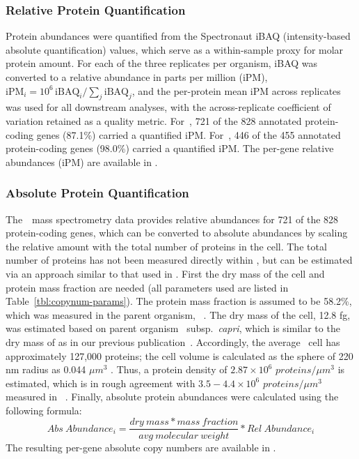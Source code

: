 \subsubsection{Relative Protein Quantification}

Protein abundances were quantified from the Spectronaut iBAQ (intensity-based absolute quantification) values, which serve as a within-sample proxy for molar protein amount.
For each of the three replicates per organism, iBAQ was converted to a relative abundance in parts per million (iPM), $\text{iPM}_i = 10^{6}\,\text{iBAQ}_i / \sum_j \text{iBAQ}_j$, and the per-protein mean iPM across replicates was used for all downstream analyses, with the across-replicate coefficient of variation retained as a quality metric.
For~\syn, 721 of the 828 annotated protein-coding genes (87.1\%) carried a quantified iPM.
For~\syna, 446 of the 455 annotated protein-coding genes (98.0\%) carried a quantified iPM.
The per-gene relative abundances (iPM) are available in \sdomics.

\subsubsection{Absolute Protein Quantification}

\label{sec:methods-ptn-quant}

The~\syn~mass spectrometry data provides relative abundances for 721 of the 828 protein-coding genes, which can be converted to absolute abundances by scaling the relative amount with the total number of proteins in the cell.
The total number of proteins has not been measured directly within \syn, but can be estimated via an approach similar to that used in \cite{breuer_essential_2019}.
First the dry mass of the cell and protein mass fraction are needed (all parameters used are listed in Table~\ref{tbl:copynum-params}).
The protein mass fraction is assumed to be 58.2\%, which was measured in the parent organism, \Mmy~\citep{razin_chemical_1963}.
The dry mass of the cell, 12.8 fg, was estimated based on parent organism \Mmy~subsp.\ \textit{capri}, which is similar to the dry mass of \jsyna as in our previous publication~\cite{breuer_essential_2019}.
Accordingly, the average \jsyn~cell has approximately 127,000 proteins; the cell volume is calculated as the sphere of 220 nm radius as 0.044 $\mu m^3$ \cite{moger-reischer_evolution_2023}.
Thus, a protein density of $2.87\times 10^{6}$ $proteins/\mu m^{3}$ is estimated, which is in rough agreement with $3.5-4.4 \times 10^{6}$ $proteins/\mu m^{3}$ measured in \eco~\citep{milo_what_2013}.
Finally, absolute protein abundances were calculated using the following formula:
\begin{equation}
\label{eqn:abs-formula}
\text{$Abs~Abundance_{i} = \frac{dry~mass * mass~fraction}{avg~molecular~weight} * Rel~Abundance_{i}$}
\end{equation}
The resulting per-gene absolute copy numbers are available in \sdomics.


